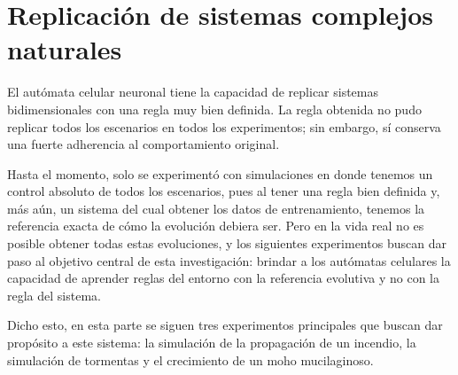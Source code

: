 \chapter{Replicación de sistemas complejos naturales}
\label{chap:naturales}

El autómata celular neuronal tiene la capacidad de replicar sistemas bidimensionales con una regla muy bien definida. La regla obtenida no pudo replicar todos los escenarios en todos los experimentos; sin embargo, sí conserva una fuerte adherencia al comportamiento original. 

Hasta el momento, solo se experimentó con simulaciones en donde tenemos un control absoluto de todos los escenarios, pues al tener una regla bien definida y, más aún, un sistema del cual obtener los datos de entrenamiento, tenemos la referencia exacta de cómo la evolución debiera ser. Pero en la vida real no es posible obtener todas estas evoluciones, y los siguientes experimentos buscan dar paso al objetivo central de esta investigación: brindar a los autómatas celulares la capacidad de aprender reglas del entorno con la referencia evolutiva y no con la regla del sistema. 

Dicho esto, en esta parte se siguen tres experimentos principales que buscan dar propósito a este sistema: la simulación de la propagación de un incendio, la simulación de tormentas y el crecimiento de un moho mucilaginoso.


